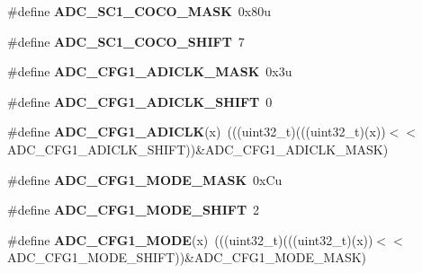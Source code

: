 \begin{DoxyCompactItemize}
\item 
\#define {\bfseries A\+D\+C\+\_\+\+S\+C1\+\_\+\+C\+O\+C\+O\+\_\+\+M\+A\+SK}~0x80u\hypertarget{group__ADC__Register__Masks_ga698a3a178a5b412febc8c0cc849e8896}{}\label{group__ADC__Register__Masks_ga698a3a178a5b412febc8c0cc849e8896}

\item 
\#define {\bfseries A\+D\+C\+\_\+\+S\+C1\+\_\+\+C\+O\+C\+O\+\_\+\+S\+H\+I\+FT}~7\hypertarget{group__ADC__Register__Masks_gad708b138ec734a371a20a990f0c9a27f}{}\label{group__ADC__Register__Masks_gad708b138ec734a371a20a990f0c9a27f}

\item 
\#define {\bfseries A\+D\+C\+\_\+\+C\+F\+G1\+\_\+\+A\+D\+I\+C\+L\+K\+\_\+\+M\+A\+SK}~0x3u\hypertarget{group__ADC__Register__Masks_ga849c3ef9995df85776d7d739475cfdd0}{}\label{group__ADC__Register__Masks_ga849c3ef9995df85776d7d739475cfdd0}

\item 
\#define {\bfseries A\+D\+C\+\_\+\+C\+F\+G1\+\_\+\+A\+D\+I\+C\+L\+K\+\_\+\+S\+H\+I\+FT}~0\hypertarget{group__ADC__Register__Masks_ga889634c9b4122a2d39f3a986688a1662}{}\label{group__ADC__Register__Masks_ga889634c9b4122a2d39f3a986688a1662}

\item 
\#define {\bfseries A\+D\+C\+\_\+\+C\+F\+G1\+\_\+\+A\+D\+I\+C\+LK}(x)~(((uint32\+\_\+t)(((uint32\+\_\+t)(x))$<$$<$A\+D\+C\+\_\+\+C\+F\+G1\+\_\+\+A\+D\+I\+C\+L\+K\+\_\+\+S\+H\+I\+FT))\&A\+D\+C\+\_\+\+C\+F\+G1\+\_\+\+A\+D\+I\+C\+L\+K\+\_\+\+M\+A\+SK)\hypertarget{group__ADC__Register__Masks_ga1f7b28bec60a20af8775724a4b33a6e6}{}\label{group__ADC__Register__Masks_ga1f7b28bec60a20af8775724a4b33a6e6}

\item 
\#define {\bfseries A\+D\+C\+\_\+\+C\+F\+G1\+\_\+\+M\+O\+D\+E\+\_\+\+M\+A\+SK}~0x\+Cu\hypertarget{group__ADC__Register__Masks_gad484c90743265c228af52bf695aaec83}{}\label{group__ADC__Register__Masks_gad484c90743265c228af52bf695aaec83}

\item 
\#define {\bfseries A\+D\+C\+\_\+\+C\+F\+G1\+\_\+\+M\+O\+D\+E\+\_\+\+S\+H\+I\+FT}~2\hypertarget{group__ADC__Register__Masks_ga0dc0ce86ab632e5fa2344da9f8617f64}{}\label{group__ADC__Register__Masks_ga0dc0ce86ab632e5fa2344da9f8617f64}

\item 
\#define {\bfseries A\+D\+C\+\_\+\+C\+F\+G1\+\_\+\+M\+O\+DE}(x)~(((uint32\+\_\+t)(((uint32\+\_\+t)(x))$<$$<$A\+D\+C\+\_\+\+C\+F\+G1\+\_\+\+M\+O\+D\+E\+\_\+\+S\+H\+I\+FT))\&A\+D\+C\+\_\+\+C\+F\+G1\+\_\+\+M\+O\+D\+E\+\_\+\+M\+A\+SK)\hypertarget{group__ADC__Register__Masks_gabdbbdc3e2263f1d453aac3fef184d997}{}\label{group__ADC__Register__Masks_gabdbbdc3e2263f1d453aac3fef184d997}


\end{DoxyCompactItemize}
